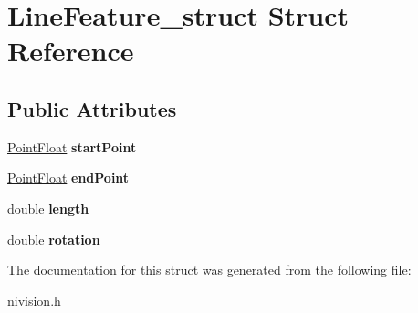 \hypertarget{structLineFeature__struct}{\section{\-Line\-Feature\-\_\-struct \-Struct \-Reference}
\label{structLineFeature__struct}
}
\subsection*{\-Public \-Attributes}
\begin{DoxyCompactItemize}
\item 
\hypertarget{structLineFeature__struct_acab0c0040a4b139c6f56a5f047e37306}{\hyperlink{structPointFloat__struct}{\-Point\-Float} {\bfseries start\-Point}}\label{structLineFeature__struct_acab0c0040a4b139c6f56a5f047e37306}

\item 
\hypertarget{structLineFeature__struct_aeefc7a3dd4ceae11235ef841c94195b7}{\hyperlink{structPointFloat__struct}{\-Point\-Float} {\bfseries end\-Point}}\label{structLineFeature__struct_aeefc7a3dd4ceae11235ef841c94195b7}

\item 
\hypertarget{structLineFeature__struct_aaa9b0b4ead3d7c4b23a54db51935ca30}{double {\bfseries length}}\label{structLineFeature__struct_aaa9b0b4ead3d7c4b23a54db51935ca30}

\item 
\hypertarget{structLineFeature__struct_a90d68e8e52c6dc755bb95cd572674057}{double {\bfseries rotation}}\label{structLineFeature__struct_a90d68e8e52c6dc755bb95cd572674057}

\end{DoxyCompactItemize}


\-The documentation for this struct was generated from the following file\-:\begin{DoxyCompactItemize}
\item 
nivision.\-h\end{DoxyCompactItemize}
